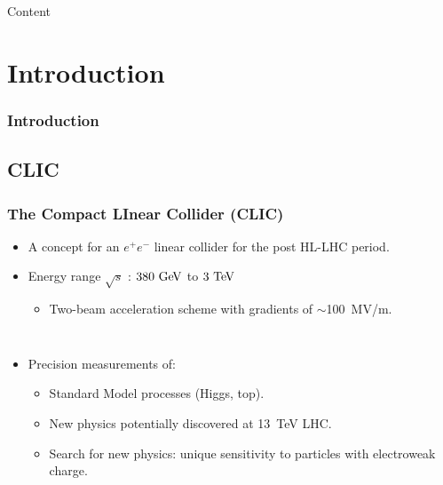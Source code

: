 
\begin{frame}{Content}{}
\tableofcontents
\end{frame}

\section{Introduction}
\begin{frame}
  \frametitle{Introduction}

\end{frame}

\subsection{CLIC}
\begin{frame}
  \frametitle{The Compact LInear Collider (CLIC)}

 
  \begin{itemize}
  \item A concept for an $e^{+}e^{-}$ linear collider for the post
    HL-LHC period.
  \item Energy range $\sqrt{s}$ : \textcolor{blue}{$380\,\mathrm{\,Ge\kern -0.1em V}$} to
    \textcolor{blue}{$3\,\mathrm{\,Te\kern -0.1em V}$}
    \begin{itemize} 
    \item Two-beam acceleration scheme with gradients of $\sim$100~MV/m.
    \end{itemize}
  \end{itemize}
  
  \begin{columns} 
    
    \begin{itemize}
    \item Precision measurements of:
      \begin{itemize}
      \item Standard Model processes (Higgs, top).
      \item New physics potentially discovered at 13~TeV LHC.
      \item Search for new physics: unique sensitivity to particles with
        electroweak charge.
      \end{itemize}
    \end{itemize}

     \centering
  \end{columns}

\end{frame}

